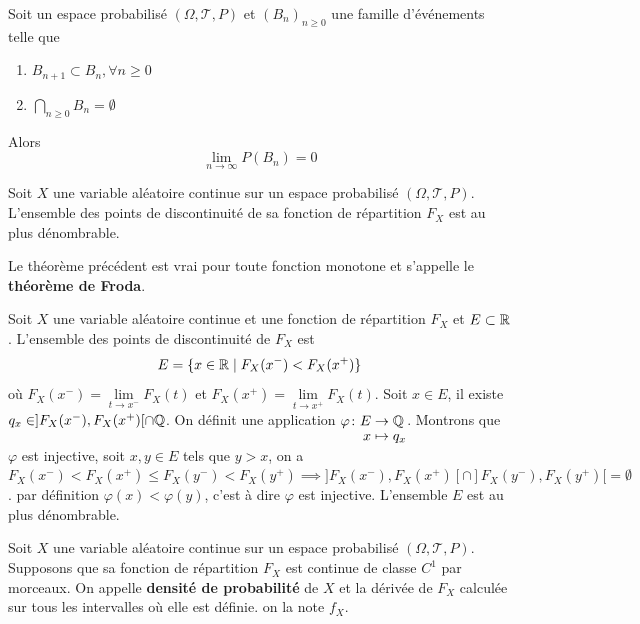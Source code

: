 \documentclass[a4paper,12pt]{article}
\begin{document}
\begin{lemme}{}{}
    Soit un espace probabilisé $(\Omega, \mathcal{T}, P)$ et $(B_n)_{n \geq 0}$ une famille d'événements telle que
    \begin{enumerate}
        \item $B_{n+1} \subset B_n, \forall n \geq 0$
        \item $\bigcap\limits_{n \geq 0} B_n = \emptyset$
    \end{enumerate}
    Alors
    $$
    \lim_{n \to \infty} P(B_n) = 0
    $$
\end{lemme}

\begin{theoreme}{}{}
    Soit $X$ une variable aléatoire continue sur un espace probabilisé $(\Omega, \mathcal{T}, P)$.
    L'ensemble des points de discontinuité de sa fonction de répartition $F_X$ est au plus dénombrable.
\end{theoreme}

\begin{remarque}
    Le théorème précédent est vrai pour toute fonction monotone et s'appelle le \textbf{théorème de Froda}.
\end{remarque}

\begin{demonstration}
    Soit $X$ une variable aléatoire continue et une fonction de répartition $F_X$ et $E \subset \mathbb{R}$.
    L'ensemble des points de discontinuité de $F_X$ est
    $$
    E = \{x \in \mathbb{R} \mid F_X(x^-) < F_X(x^+)\}
    $$
    où $F_X(x^-) = \lim\limits_{t \to x^-} F_X(t)$ et $F_X(x^+) = \lim\limits_{t \to x^+} F_X(t)$.
    Soit $x \in E$, il existe $q_x \in ]F_X(x^-), F_X(x^+)[ \cap \mathbb{Q}$.
    On définit une application $\funcdef{\varphi}{E}{\Q}{x}{q_x}$.
    Montrons que $\varphi$ est injective, soit $x, y \in E$ tels que $y > x$, on a $F_X(x^-) < F_X(x^+) \leq F_X(y^-) < F_X(y^+) \implies ]F_X(x^-), F_X(x^+)[\cap]F_X(y^-), F_X(y^+)[ = \emptyset$.
    par définition $\varphi(x) < \varphi(y)$, c'est à dire $\varphi$ est injective. L'ensemble $E$ est au plus dénombrable.
\end{demonstration}

\begin{definition}
    Soit $X$ une variable aléatoire continue sur un espace probabilisé $(\Omega, \mathcal{T}, P)$.
    Supposons que sa fonction de répartition $F_X$ est continue de classe $C^1$ par morceaux.
    On appelle \textbf{densité de probabilité} de $X$ et la dérivée de $F_X$ calculée sur tous les intervalles
    où elle est définie. on la note $f_X$.
\end{definition}
\end{document}
